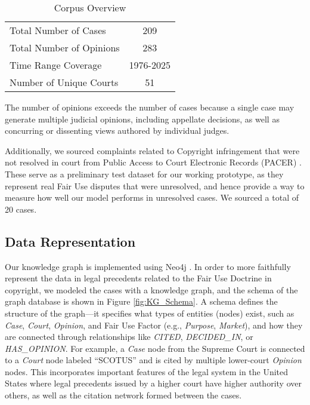 \begin{table}[h!]
  \centering
  \caption{Corpus Overview}
  \begin{tabular}{lc}
    \toprule
    Total Number of Cases & 209 \\
    Total Number of Opinions & 283 \\
    Time Range Coverage & 1976-2025\\
    Number of Unique Courts & 51 \\
    \bottomrule
  \end{tabular}
\end{table}

The number of opinions exceeds the number of cases because a single case may generate multiple judicial opinions, including appellate decisions, as well as concurring or dissenting views authored by individual judges.

Additionally, we sourced complaints related to Copyright infringement that were not resolved in court from Public Access to Court Electronic Records (PACER) \cite{26_PACER}. These serve as a preliminary test dataset for our working prototype, as they represent real Fair Use disputes that were unresolved, and hence provide a way to measure how well our model performs in unresolved cases. We sourced a total of 20 cases.

\subsection{Data Representation}
\label{sec: data_representation_KG}

Our knowledge graph is implemented using Neo4j \cite{27_neo4j}. In order to more faithfully represent the data in legal precedents related to the Fair Use Doctrine in copyright, we modeled the cases with a knowledge graph, and the schema of the graph database is shown in Figure \ref{fig:KG_Schema}. A schema defines the structure of the graph—it specifies what types of entities (nodes) exist, such as \textit{Case}, \textit{Court}, \textit{Opinion}, and Fair Use Factor (e.g., \textit{Purpose}, \textit{Market}), and how they are connected through relationships like \textit{CITED}, \textit{DECIDED\_IN}, or \textit{HAS\_OPINION}. For example, a \textit{Case} node from the Supreme Court is connected to a \textit{Court} node labeled ``SCOTUS'' and is cited by multiple lower-court \textit{Opinion} nodes.  This incorporates important features of the legal system in the United States where legal precedents issued by a higher court have higher authority over others, as well as the citation network formed between the cases.

